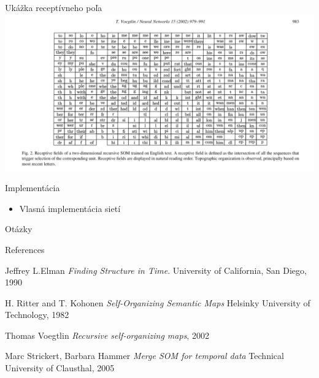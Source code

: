 \documentclass[10pt]{beamer}
\begin{document}
\begin{frame}[fragile]{Ukážka receptívneho poľa}
\includegraphics[width=\textwidth]{receptive_field}
\end{frame}

\begin{frame}{Implementácia}

\begin{itemize}
  \item Vlasná implementácia sietí
\end{itemize}

\end{frame}


{
\begin{frame}[standout]
  Otázky
\end{frame}
}

\appendix


\begin{frame}[allowframebreaks]{References}

  
  
\begin{thebibliography}{9}
Jeffrey L.Elman
\textit{Finding Structure in Time}. 
University of California, San Diego, 1990
 
H. Ritter and T. Kohonen
\textit{Self-Organizing Semantic Maps} 
Helsinky University of Technology, 1982
  
Thomas Voegtlin
\textit{Recursive self-organizing maps}, 2002
 
Marc Strickert, Barbara Hammer
\textit{Merge SOM for temporal data}
Technical University of Clausthal, 2005
 
\end{thebibliography}

\end{frame}
\end{document}
